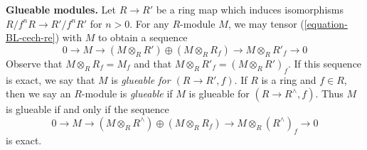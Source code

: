 \documentclass{amsart}
\theoremstyle{plain}
\theoremstyle{definition}
\theoremstyle{remark}
\numberwithin{equation}{subsection}
\begin{document}
{\bf Glueable modules.}
Let $R \to R'$ be a ring map which induces isomorphisms
$R/f^nR \to R'/f^nR'$ for $n > 0$. For any $R$-module $M$, we
may tensor (\ref{equation-BL-cech-re}) with $M$ to obtain a sequence
\begin{equation}
\label{equation-BL-cech-mod-re}
0 \to M \to (M \otimes_R R') \oplus (M \otimes_R R_f) \to
M \otimes_R R'_f \to 0
\end{equation}
Observe that $M \otimes_R R_f = M_f$ and that
$M \otimes_R R'_f = (M \otimes_R R')_f$.
If this sequence is exact, we say that $M$ is
\emph{glueable for $(R \to R', f)$}.
If $R$ is a ring and $f \in R$, then we say an $R$-module
is \emph{glueable} if $M$ is glueable for $(R \to R^\wedge, f)$.
Thus $M$ is glueable if and only if the sequence
\begin{equation}
\label{equation-BL-cech-mod}
0 \to M \to (M \otimes_R R^\wedge) \oplus (M \otimes_R R_f) \to
M \otimes_R (R^\wedge)_f \to 0
\end{equation}
is exact.
\end{document}
